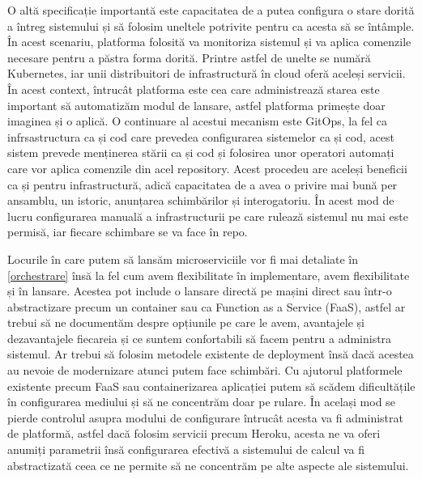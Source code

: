 O altă specificație importantă este capacitatea de a putea configura o stare dorită a întreg 
sistemului și să folosim uneltele potrivite pentru ca acesta să se întâmple. În acest
scenariu, platforma folosită va monitoriza sistemul și va aplica comenzile necesare pentru
a păstra forma dorită. Printre astfel de unelte se numără Kubernetes, iar unii distribuitori
de infrastructură în cloud oferă aceleși servicii. În acest context, întrucât platforma este 
cea care administrează starea este important să automatizăm modul de lansare, astfel platforma
primește doar imaginea și o aplică. O continuare al acestui mecanism este GitOps, la fel ca
infrsastructura ca și cod care prevedea configurarea sistemelor ca și cod, acest sistem
prevede menținerea stării ca și cod și folosirea unor operatori automați care vor aplica
comenzile din acel repository. Acest procedeu are aceleși beneficii ca și pentru infrastructură, 
adică capacitatea de a avea o privire mai bună per ansamblu, un istoric, anunțarea schimbărilor
și interogatoriu. În acest mod de lucru configurarea manuală a infrastructurii pe care 
rulează sistemul nu mai este permisă, iar fiecare schimbare se va face în repo.

Locurile în care putem să lansăm microserviciile vor fi mai detaliate în \autoref{orchestrare} %
însă la fel cum avem flexibilitate în implementare, avem flexibilitate și în lansare. Acestea 
pot include o lansare directă pe mașini direct sau într-o abstractizare precum un container sau ca
Function as a Service (FaaS), astfel ar trebui să ne documentăm despre opțiunile pe care le avem,
avantajele și dezavantajele fiecareia și ce suntem confortabili să facem pentru a administra sistemul.
Ar trebui să folosim metodele existente de deployment însă dacă acestea au nevoie de modernizare
atunci putem face schimbări. Cu ajutorul platformele existente precum FaaS sau containerizarea
aplicației putem să scădem dificultățile în configurarea mediului și să ne concentrăm doar pe
rulare. În același mod se pierde controlul asupra modului de configurare întrucât 
acesta va fi administrat de platformă, astfel dacă folosim servicii precum Heroku, acesta ne va oferi
anumiți parametrii însă configurarea efectivă a sistemului de calcul va fi abstractizată ceea ce ne
permite să ne concentrăm pe alte aspecte ale sistemului. 


